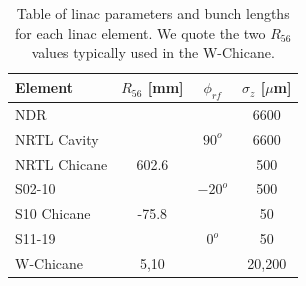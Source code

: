 \documentclass[%
twocolumn,
showpacs,preprintnumbers,
 aps,
prstab,
]{revtex4-1}
\begin{document}
\begin{table}
  \begin{tabular}{ l c c c}
    \hline
    Element & $R_{56}$ [mm] & $\phi_{rf}$ & $\sigma_z$ [$\mu$m] \\ \hline
    NDR &  & & 6600 \\
    NRTL Cavity &  & $ 90^o$ & 6600 \\
    NRTL Chicane & 602.6 & & 500 \\
    S02-10 &  & $-20^o$ & 500 \\
    S10 Chicane & -75.8 & & 50 \\
    S11-19 & & $0^o$ & 50 \\
    W-Chicane & 5,10 & & 20,200 \\
    \hline
  \end{tabular}
   \caption{Table of linac parameters and bunch lengths for each linac element. We quote the two $R_{56}$ values typically used in the W-Chicane.}
   \label{dat_table}
\end{table}






\end{document}
